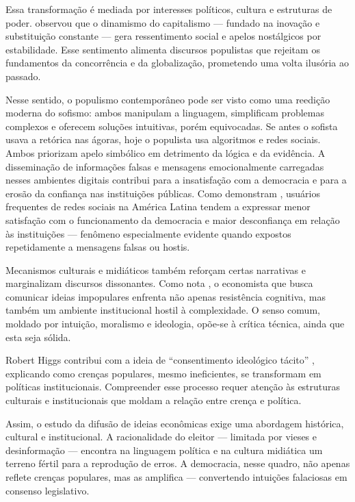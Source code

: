 Essa transformação é mediada por interesses políticos, cultura e estruturas de poder.  observou que o dinamismo do capitalismo — fundado na inovação e substituição constante — gera ressentimento social e apelos nostálgicos por estabilidade. Esse sentimento alimenta discursos populistas que rejeitam os fundamentos da concorrência e da globalização, prometendo uma volta ilusória ao passado.

Nesse sentido, o populismo contemporâneo pode ser visto como uma reedição moderna do sofismo: ambos manipulam a linguagem, simplificam problemas complexos e oferecem soluções intuitivas, porém equivocadas. Se antes o sofista usava a retórica nas ágoras, hoje o populista usa algoritmos e redes sociais. Ambos priorizam apelo simbólico em detrimento da lógica e da evidência. A disseminação de informações falsas e mensagens emocionalmente carregadas nesses ambientes digitais contribui para a insatisfação com a democracia e para a erosão da confiança nas instituições públicas. Como demonstram , usuários frequentes de redes sociais na América Latina tendem a expressar menor satisfação com o funcionamento da democracia e maior desconfiança em relação às instituições — fenômeno especialmente evidente quando expostos repetidamente a mensagens falsas ou hostis.

Mecanismos culturais e midiáticos também reforçam certas narrativas e marginalizam discursos dissonantes. Como nota , o economista que busca comunicar ideias impopulares enfrenta não apenas resistência cognitiva, mas também um ambiente institucional hostil à complexidade. O senso comum, moldado por intuição, moralismo e ideologia, opõe-se à crítica técnica, ainda que esta seja sólida.

Robert Higgs contribui com a ideia de ``consentimento ideológico tácito'' \cite{higgs1987crisis}, explicando como crenças populares, mesmo ineficientes, se transformam em políticas institucionais. Compreender esse processo requer atenção às estruturas culturais e institucionais que moldam a relação entre crença e política.

Assim, o estudo da difusão de ideias econômicas exige uma abordagem histórica, cultural e institucional. A racionalidade do eleitor — limitada por vieses e desinformação — encontra na linguagem política e na cultura midiática um terreno fértil para a reprodução de erros. A democracia, nesse quadro, não apenas reflete crenças populares, mas as amplifica — convertendo intuições falaciosas em consenso legislativo.


